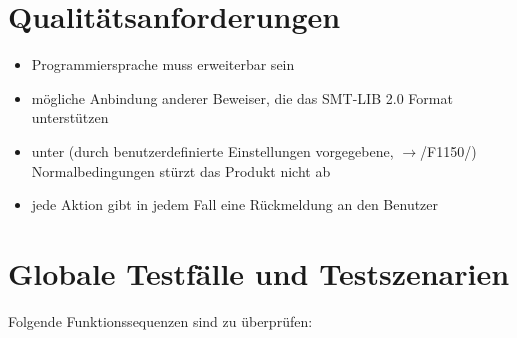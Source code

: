 \documentclass[a4paper,10pt]{article}
\begin{document}
\section{Qualit\"{a}tsanforderungen}
\begin{itemize}
  \item Programmiersprache muss erweiterbar sein
  \item m\"{o}gliche Anbindung anderer Beweiser, die das SMT-LIB 2.0 Format unterst\"{u}tzen
  \item unter (durch benutzerdefinierte Einstellungen vorgegebene, $\to$/F1150/) Normalbedingungen st\"{u}rzt das Produkt nicht ab
  \item jede Aktion gibt in jedem Fall eine R\"{u}ckmeldung an den Benutzer
\end{itemize}

\section{Globale Testf\"{a}lle und Testszenarien}
Folgende Funktionssequenzen sind zu \"{u}berpr\"{u}fen:\\
\end{document}
